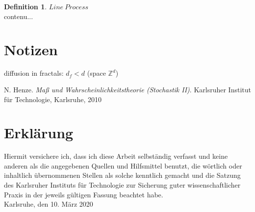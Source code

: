 \documentclass[12pt,a4paper]{scrartcl}
\numberwithin{equation}{section}
\numberwithin{equation}{section}%
\theoremstyle{definition}
\newtheorem{definition}[theorem]{Definition}
\theoremstyle{definition}
\begin{document}
\begin{definition} $\mathit{Line\ Process}$\\
	contenu...
\end{definition}



\newpage


\section{Notizen}

diffusion in fractals: $d_f < d$ (space $\mathbb{Z}^d$)


\newpage

\begin{thebibliography}{Lam00}
\thispagestyle{empty}

N. Henze.
\emph{Maß und Wahrscheinlichkeitstheorie (Stochastik II)}.
Karlsruher Institut für Technologie, Karlsruhe, 2010

\end{thebibliography}

\newpage
  
\thispagestyle{empty}

\vspace*{8cm}


\section*{Erklärung}

Hiermit versichere ich, dass ich diese Arbeit selbständig verfasst und keine anderen als die angegebenen Quellen und Hilfsmittel benutzt, die wörtlich oder inhaltlich übernommenen Stellen als solche kenntlich gemacht und die Satzung des Karlsruher Instituts für Technologie zur Sicherung guter wissenschaftlicher Praxis in der jeweils gültigen Fassung beachtet habe. \\[2ex] 

\noindent
Karlsruhe, den 10. März 2020\\[5ex] 
\end{document}
